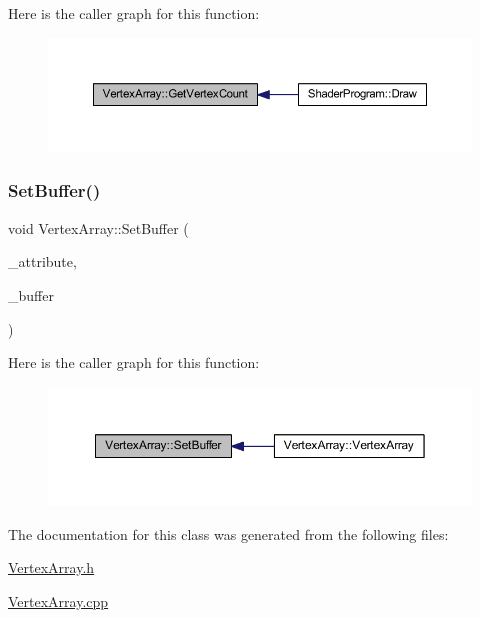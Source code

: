 Here is the caller graph for this function\+:
\nopagebreak
\begin{figure}[H]
\begin{center}
\leavevmode
\includegraphics[width=350pt]{class_vertex_array_a94f9ebffa24c5721783099fef186f9a0_icgraph}
\end{center}
\end{figure}
\mbox{\label{class_vertex_array_a35c33c02c2dfd594e36a2a96154b4f89}} 
\subsubsection{\texorpdfstring{Set\+Buffer()}{SetBuffer()}}
{\footnotesize\ttfamily void Vertex\+Array\+::\+Set\+Buffer (\begin{DoxyParamCaption}\item[{std\+::string}]{\+\_\+attribute,  }\item[{std\+::weak\+\_\+ptr$<$ \mbox{\hyperlink{class_vertex_buffer}{Vertex\+Buffer}} $>$}]{\+\_\+buffer }\end{DoxyParamCaption})}

Here is the caller graph for this function\+:
\nopagebreak
\begin{figure}[H]
\begin{center}
\leavevmode
\includegraphics[width=350pt]{class_vertex_array_a35c33c02c2dfd594e36a2a96154b4f89_icgraph}
\end{center}
\end{figure}


The documentation for this class was generated from the following files\+:\begin{DoxyCompactItemize}
\item 
\mbox{\hyperlink{_vertex_array_8h}{Vertex\+Array.\+h}}\item 
\mbox{\hyperlink{_vertex_array_8cpp}{Vertex\+Array.\+cpp}}\end{DoxyCompactItemize}
